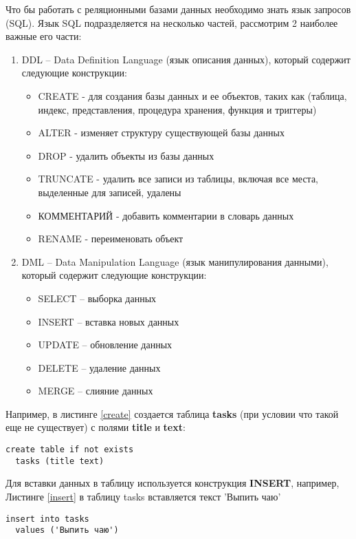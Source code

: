 \documentclass[a4paper]{article}
\begin{document}
Что бы работать с реляционными базами данных необходимо знать язык запросов (SQL).
Язык SQL подразделяется на несколько частей, рассмотрим 2 наиболее важные его части:
\begin{enumerate}
  \item DDL – Data Definition Language (язык описания данных), который содержит следующие конструкции:
    \begin{itemize}
      \item CREATE - для создания базы данных и ее объектов, таких как (таблица, индекс, представления, процедура хранения, функция и триггеры)
      \item ALTER - изменяет структуру существующей базы данных
      \item DROP - удалить объекты из базы данных
      \item TRUNCATE - удалить все записи из таблицы, включая все места, выделенные для записей, удалены
      \item КОММЕНТАРИЙ - добавить комментарии в словарь данных
      \item RENAME - переименовать объект
    \end{itemize}
  \item DML – Data Manipulation Language (язык манипулирования данными), который содержит следующие конструкции:
    \begin{itemize}
        \item SELECT – выборка данных
        \item INSERT – вставка новых данных
        \item UPDATE – обновление данных
        \item DELETE – удаление данных
        \item MERGE – слияние данных
    \end{itemize}
\end{enumerate}

Например, в листинге \ref{create} создается таблица \textbf{tasks} (при условии что такой еще не существует) с полями \textbf{title} и \textbf{text}:

\begin{lstlisting}[label=create,caption=Создание таблицы]
  create table if not exists
  tasks (title text)
\end{lstlisting}

Для вставки данных в таблицу используется конструкция \textbf{INSERT}, например, Листинге \ref{insert} в таблицу tasks вставляется текст 'Выпить чаю'

\begin{lstlisting}[label=insert,caption=Добавление новой записи]
  insert into tasks
  values ('Выпить чаю')
\end{lstlisting}
\end{document}
